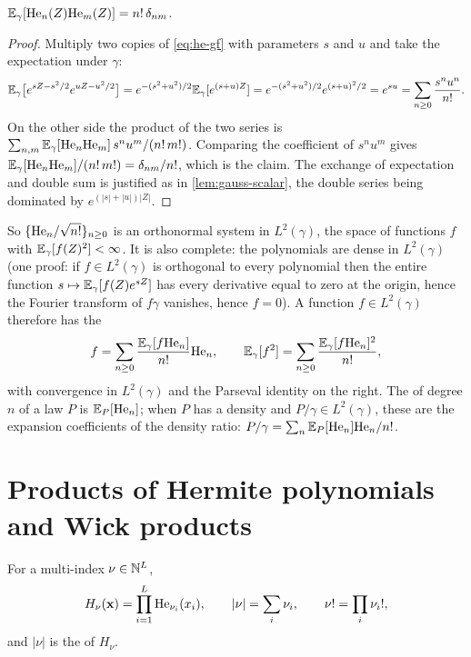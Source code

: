 \begin{proposition}[Orthogonality]
\label{prop:he-orth}
$\mathbb{E}_\gamma[\mathrm{He}_{n}(Z)\mathrm{He}_{m}(Z)]=n!\,\delta_{nm}$.
\end{proposition}
\begin{proof}
Multiply two copies of \cref{eq:he-gf} with parameters $s$ and $u$ and take the
expectation under $\gamma$:
\[
  \mathbb{E}_\gamma\bigl[e^{sZ-s^2/2}e^{uZ-u^2/2}\bigr]=e^{-(s^2+u^2)/2}\mathbb{E}_\gamma[e^{(s+u)Z}]
  =e^{-(s^2+u^2)/2}e^{(s+u)^2/2}=e^{su}=\sum_{n\ge0}\frac{s^nu^n}{n!}.
\]
On the other side the product of the two series is
$\sum_{n,m}\mathbb{E}_\gamma[\mathrm{He}_{n}\mathrm{He}_{m}]\,s^nu^m/(n!\,m!)$. Comparing the coefficient of
$s^nu^m$ gives $\mathbb{E}_\gamma[\mathrm{He}_{n}\mathrm{He}_{m}]/(n!\,m!)=\delta_{nm}/n!$, which is the claim. The exchange of expectation and double sum is justified as in
\cref{lem:gauss-scalar}, the double series being dominated by $e^{(|s|+|u|)|Z|}$.
\end{proof}

So $\{\mathrm{He}_{n}/\sqrt{n!}\}_{n\ge0}$ is an orthonormal system in $L^2(\gamma)$, the
space of functions $f$ with $\mathbb{E}_\gamma[f(Z)^2]<\infty$. It is also complete: the
polynomials are dense in $L^2(\gamma)$ (one proof: if $f\in L^2(\gamma)$ is orthogonal to
every polynomial then the entire function $s\mapsto\mathbb{E}_\gamma[f(Z)e^{sZ}]$ has every
derivative equal to zero at the origin, hence the Fourier transform of $f\gamma$ vanishes,
hence $f=0$). A function $f\in L^2(\gamma)$ therefore has the 
\begin{equation}
  f=\sum_{n\ge0}\frac{\mathbb{E}_\gamma[f\mathrm{He}_{n}]}{n!}\mathrm{He}_{n},\qquad
  \mathbb{E}_\gamma[f^2]=\sum_{n\ge0}\frac{\mathbb{E}_\gamma[f\mathrm{He}_{n}]^2}{n!},
  \label{eq:hermite-expansion}
\end{equation}
with convergence in $L^2(\gamma)$ and the Parseval identity on the right. The
 of degree $n$ of a law $P$ is $\mathbb{E}_P[\mathrm{He}_{n}]$; when $P$ has a
density and $P/\gamma\in L^2(\gamma)$, these are the expansion coefficients of the
density ratio: $P/\gamma=\sum_n\mathbb{E}_P[\mathrm{He}_{n}]\mathrm{He}_{n}/n!$.

\section{Products of Hermite polynomials and Wick products}

\begin{definition}
For a multi-index $\nu\in\mathbb N^{L}$,
\[
  H_\nu(\mathbf{x})=\prod_{i=1}^{L}\mathrm{He}_{\nu_i}(x_i),\qquad |\nu|=\sum_i\nu_i,\qquad \nu!=\prod_i\nu_i!,
\]
and $|\nu|$ is the  of $H_\nu$.
\end{definition}

